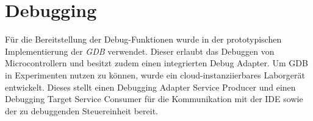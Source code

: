 \section{Debugging}\label{section:prototypische-implementierung:debugging}


Für die Bereitstellung der Debug-Funktionen wurde in der prototypischen Implementierung der \textit{\ac{GDB}} \cite{noauthor_gdb_nodate} verwendet. Dieser erlaubt das Debuggen von Microcontrollern und besitzt zudem einen integrierten Debug Adapter. Um \ac{GDB} in Experimenten nutzen zu können, wurde ein cloud-instanziierbares Laborgerät entwickelt. Dieses stellt einen Debugging Adapter Service Producer und einen Debugging Target Service Consumer für die Kommunikation mit der IDE sowie der zu debuggenden Steuereinheit bereit.

